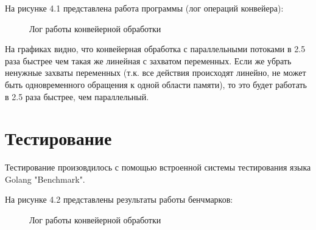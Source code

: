 \documentclass[12pt]{report}
\begin{document}
На рисунке 4.1 представлена работа программы (лог операций конвейера):
\begin{figure}[h]
	\caption{Лог работы конвейерной обработки}
	\label{fig:v_st}
\end{figure}
\begin{center}

\end{center}


На графиках видно, что конвейерная обработка с параллельными потоками в 2.5 раза быстрее чем такая же линейная с захватом переменных.
Если же убрать ненужные захваты переменных (т.к. все действия происходят линейно, не может быть одновременного обращения к одной области памяти), то это будет работать в 2.5 раза быстрее, чем параллельный.

\section{Тестирование}
Тестирование произовдилось с помощью встроенной системы тестирования языка Golang "Benchmark".


На рисунке 4.2 представлены результаты работы бенчмарков:
\begin{figure}[h]
	\caption{Лог работы конвейерной обработки}
	\label{fig:v_st}
\end{figure}
\end{document}
